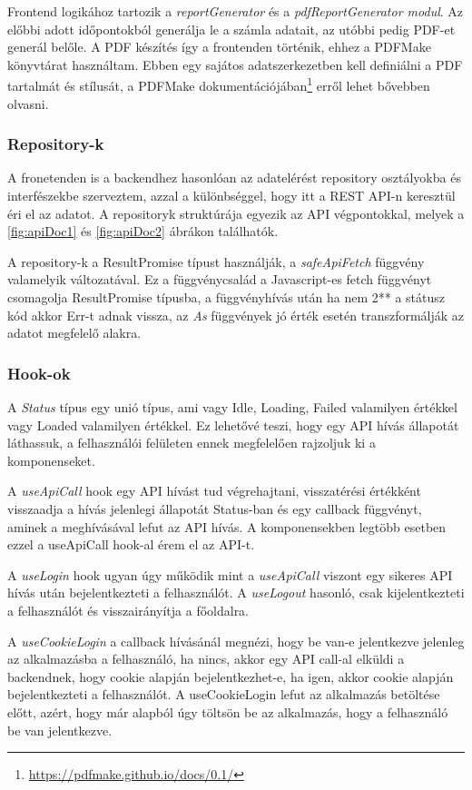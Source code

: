Frontend logikához tartozik a \textit{reportGenerator} és a \textit{pdfReportGenerator modul}. Az előbbi adott időpontokból generálja le a számla adatait, az utóbbi pedig PDF-et generál belőle. A PDF készítés így a frontenden történik, ehhez a PDFMake könyvtárat használtam. Ebben egy sajátos adatszerkezetben kell definiálni a PDF tartalmát és stílusát, a PDFMake dokumentációjában\footnote{\url{https://pdfmake.github.io/docs/0.1/}} erről lehet bővebben olvasni.

\subsubsection{Repository-k}

A fronetenden is a backendhez hasonlóan az adatelérést repository osztályokba és interfészekbe szerveztem, azzal a különbséggel, hogy itt a REST API-n keresztül éri el az adatot. A repositoryk struktúrája egyezik az API végpontokkal, melyek a \ref{fig:apiDoc1} és \ref{fig:apiDoc2} ábrákon találhatók.

A repository-k a ResultPromise típust használják, a \textit{safeApiFetch} függvény valamelyik változatával. Ez a függvénycsalád a Javascript-es fetch függvényt csomagolja ResultPromise típusba, a függvényhívás után ha nem 2** a státusz kód akkor Err-t adnak vissza, az \textit{As} függvények jó érték esetén transzformálják az adatot megfelelő alakra. 

\subsubsection{Hook-ok}

A \textit{Status} típus egy unió típus, ami vagy Idle, Loading, Failed valamilyen értékkel vagy Loaded valamilyen értékkel. Ez lehetővé teszi, hogy egy API hívás állapotát láthassuk, a felhasználói felületen ennek megfelelően rajzoljuk ki a komponenseket.

A \textit{useApiCall} hook egy API hívást tud végrehajtani, visszatérési értékként visszaadja a hívás jelenlegi állapotát Status-ban és egy callback függvényt, aminek a meghívásával lefut az API hívás. A komponensekben legtöbb esetben ezzel a useApiCall hook-al érem el az API-t.

A \textit{useLogin} hook ugyan úgy működik mint a \textit{useApiCall} viszont egy sikeres API hívás után bejelentkezteti a felhasználót. A \textit{useLogout} hasonló, csak kijelentkezteti a felhasználót és visszairányítja a főoldalra.

A \textit{useCookieLogin} a callback hívásánál megnézi, hogy be van-e jelentkezve jelenleg az alkalmazásba a felhasználó, ha nincs, akkor egy API call-al elküldi a backendnek, hogy cookie alapján bejelentkezhet-e, ha igen, akkor cookie alapján bejelentkezteti a felhasználót. A useCookieLogin lefut az alkalmazás betöltése előtt, azért, hogy már alapból úgy töltsön be az alkalmazás, hogy a felhasználó be van jelentkezve.

